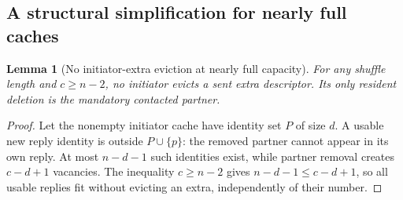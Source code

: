 \documentclass[11pt]{article}
\newtheorem{lemma}[theorem]{Lemma}
\begin{document}
\subsection{A structural simplification for nearly full caches}

\begin{lemma}[No initiator-extra eviction at nearly full capacity]
\label{lem:densenoevict}
For any shuffle length and $c\ge n-2$, no initiator
evicts a sent extra descriptor. Its only resident
deletion is the mandatory contacted partner.
\end{lemma}
\begin{proof}
Let the nonempty initiator cache have identity set $P$
of size $d$. A usable new reply identity is outside
$P\cup\{p\}$: the removed partner cannot appear in
its own reply. At most $n-d-1$ such identities exist,
while partner removal creates $c-d+1$ vacancies.
The inequality $c\ge n-2$ gives
$n-d-1\le c-d+1$, so all usable replies fit without
evicting an extra, independently of their number.
\end{proof}
\end{document}
